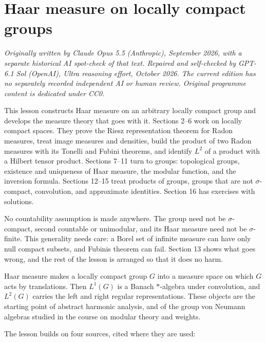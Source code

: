 \documentclass[
  english,
  11pt,
  a4paper,
]{article}
\begin{document}
\section{Haar measure on locally compact
groups}\label{haar-measure-on-locally-compact-groups}

\emph{Originally written by Claude Opus 5.5 (Anthropic), September 2026,
with a separate historical AI spot-check of that text. Repaired and
self-checked by GPT-6.1 Sol (OpenAI), Ultra reasoning effort, October
2026. The current edition has no separately recorded independent AI or
human review. Original programme content is dedicated under CC0.}

This lesson constructs Haar measure on an arbitrary locally compact
group and develops the measure theory that goes with it. Sections 2--6
work on locally compact spaces. They prove the Riesz representation
theorem for Radon measures, treat image measures and densities, build
the product of two Radon measures with its Tonelli and Fubini theorems,
and identify \(L^2\) of a product with a Hilbert tensor product.
Sections 7--11 turn to groups: topological groups, existence and
uniqueness of Haar measure, the modular function, and the inversion
formula. Sections 12--15 treat products of groups, groups that are not
\(\sigma\)-compact, convolution, and approximate identities. Section 16
has exercises with solutions.

No countability assumption is made anywhere. The group need not be
\(\sigma\)-compact, second countable or unimodular, and its Haar measure
need not be \(\sigma\)-finite. This generality needs care: a Borel set
of infinite measure can have only null compact subsets, and
Fubini\textquotesingle s theorem can fail. Section 13 shows what goes
wrong, and the rest of the lesson is arranged so that it does no harm.

Haar measure makes a locally compact group \(G\) into a measure space on
which \(G\) acts by translations. Then \(L^1(G)\) is a Banach
\(*\)-algebra under convolution, and \(L^2(G)\) carries the left and
right regular representations. These objects are the starting point of
abstract harmonic analysis, and of the group von Neumann algebras
studied in the course on modular theory and weights.

The lesson builds on four sources, cited where they are used:
\end{document}
